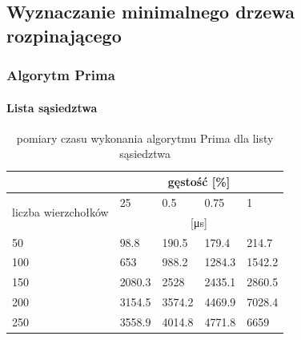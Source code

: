 \documentclass[11pt]{article}
\begin{document}
\subsection{Wyznaczanie minimalnego drzewa rozpinającego}
\subsubsection{Algorytm Prima}
\paragraph{Lista sąsiedztwa}
\begin{table}[H]
    \centering
    \begin{tabular}{|l|llll|}
        \hline
                                             & \multicolumn{4}{c|}{gęstość {[}\%{]}}                                                                      \\ \hline
        \multirow{2}{*}{liczba wierzchołków} & \multicolumn{1}{l|}{25}               & \multicolumn{1}{l|}{0.5}    & \multicolumn{1}{l|}{0.75}   & 1      \\ \cline{2-5}
                                             & \multicolumn{4}{c|}{[μs]}                                                                                  \\ \hline
        50                                   & \multicolumn{1}{l|}{98.8}             & \multicolumn{1}{l|}{190.5}  & \multicolumn{1}{l|}{179.4}  & 214.7  \\ \hline
        100                                  & \multicolumn{1}{l|}{653}              & \multicolumn{1}{l|}{988.2}  & \multicolumn{1}{l|}{1284.3} & 1542.2 \\ \hline
        150                                  & \multicolumn{1}{l|}{2080.3}           & \multicolumn{1}{l|}{2528}   & \multicolumn{1}{l|}{2435.1} & 2860.5 \\ \hline
        200                                  & \multicolumn{1}{l|}{3154.5}           & \multicolumn{1}{l|}{3574.2} & \multicolumn{1}{l|}{4469.9} & 7028.4 \\ \hline
        250                                  & \multicolumn{1}{l|}{3558.9}           & \multicolumn{1}{l|}{4014.8} & \multicolumn{1}{l|}{4771.8} & 6659   \\ \hline
    \end{tabular}
    \caption{pomiary czasu wykonania algorytmu Prima dla listy sąsiedztwa}
\end{table}
\end{document}
